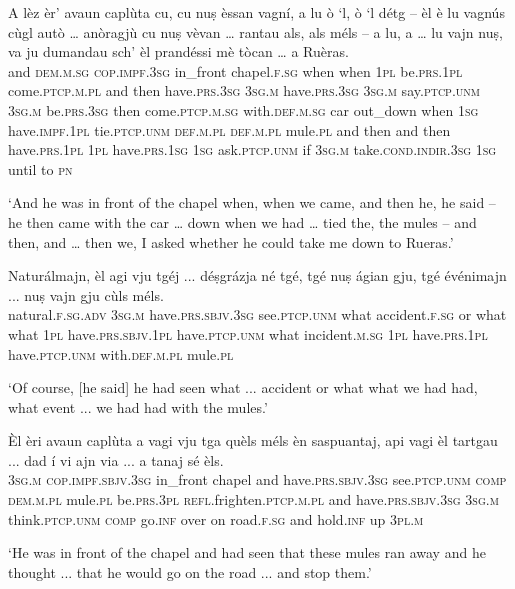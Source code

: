 \begin{linenumbers}
\gll   A lèz èr’ avaun caplùta cu, cu nuṣ èssan vagní, a lu ò `l, ò `l détg – èl è lu vagnús cùgl autò … anòragjù cu nuṣ vèvan … rantau als, als méls – a lu, a … lu vajn nuṣ, va ju dumandau sch’ èl prandéssi mè tòcan … a Ruèras. \\
and \textsc{dem.m.sg} \textsc{cop.impf.3sg} in\_front  chapel.\textsc{f.sg} when when \textsc{1pl} be.\textsc{prs.1pl}  come.\textsc{ptcp.m.pl} and then have.\textsc{prs.3sg} \textsc{3sg.m} have.\textsc{prs.3sg} \textsc{3sg.m} say.\textsc{ptcp.unm} {} \textsc{3sg.m}  be.\textsc{prs.3sg} then come.\textsc{ptcp.m.sg} with.\textsc{def.m.sg} car {} out\_down when \textsc{1sg} have.\textsc{impf.1pl} {} tie.\textsc{ptcp.unm} \textsc{def.m.pl} \textsc{def.m.pl} mule.\textsc{pl} {} and then and {} then have.\textsc{prs.1pl} \textsc{1pl} have.\textsc{prs.1sg}  \textsc{1sg} ask.\textsc{ptcp.unm} if \textsc{3sg.m} take.\textsc{cond.indir.3sg} \textsc{1sg} until {} to  \textsc{pn}\\
\end{linenumbers}
\medskip
\glt `And he was in front of the chapel when, when we came, and then he, he said – he then came with the car … down when we had … tied the, the mules – and then, and … then we, I asked whether he could take me down to Rueras.'
\medskip 

\begin{linenumbers}
\gll Naturálmajn, èl agi vju tgéj ... déṣgrázja né tgé, tgé nuṣ ágian gju, tgé événimajn ... nuṣ vajn gju cùls méls.\\
natural.\textsc{f.sg.adv} \textsc{3sg.m} have.\textsc{prs.sbjv.3sg} see.\textsc{ptcp.unm} what {} accident.\textsc{f.sg} or what what \textsc{1pl} have.\textsc{prs.sbjv.1pl} have.\textsc{ptcp.unm} what incident.\textsc{m.sg} {} \textsc{1pl} have.\textsc{prs.1pl} have.\textsc{ptcp.unm} with.\textsc{def.m.pl} mule.\textsc{pl} \\
\end{linenumbers}
\medskip
\glt `Of course, [he said] he had seen what ... accident or what what we had had, what event ... we had had with the mules.' 
\medskip

\begin{linenumbers}
\gll  Èl èri avaun caplùta a vagi vju tga quèls méls èn saspuantaj, api vagi èl tartgau ... dad í vi ajn via ... a tanaj sé èls.  \\
 \textsc{3sg.m} \textsc{cop.impf.sbjv.3sg} in\_front chapel and have.\textsc{prs.sbjv.3sg} see.\textsc{ptcp.unm} \textsc{comp} \textsc{dem.m.pl} mule.\textsc{pl} be.\textsc{prs.3pl} \textsc{refl.}frighten.\textsc{ptcp.m.pl} and have.\textsc{prs.sbjv.3sg} \textsc{3sg.m} think.\textsc{ptcp.unm} {} \textsc{comp} go.\textsc{inf} over on road.\textsc{f.sg} {} and hold.\textsc{inf} up \textsc{3pl.m}\\
\end{linenumbers}
\medskip
\glt `He was in front of the chapel and had seen that these mules ran away and he thought ... that he would go on the road ... and stop them.'
\medskip

